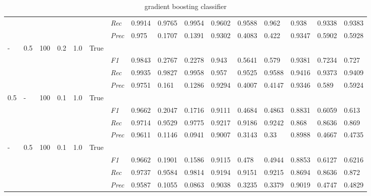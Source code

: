 \begin{table}[]
\begin{tabularx}{\textwidth}{XXXXXX|X|XXX|XXX|XXX}
    & & & & & & \textit{Rec} & 0.9914 & 0.9765 & 0.9954    & 0.9602 & 0.9588    & 0.962    & 0.938    & 0.9338    & 0.9383    \\
    & & & & & & \textit{Prec} & 0.975 & 0.1707 & 0.1391 & 0.9302 & 0.4083 & 0.422 & 0.9347 & 0.5902 & 0.5928 \\ \midrule
    - & 0.5 & 100 & 0.2 & 1.0 &True & & & & & & & & & \\
    & & & & & & \textit{F1} & 0.9843 & 0.2767 & 0.2278 & 0.943 & 0.5641        & 0.579        & 0.9381        & 0.7234        & 0.727        \\
    & & & & & & \textit{Rec} & 0.9935 & 0.9827 & 0.9958    & 0.957 & 0.9525    & 0.9588    & 0.9416    & 0.9373    & 0.9409    \\
    & & & & & & \textit{Prec} & 0.9751 & 0.161 & 0.1286 & 0.9294 & 0.4007 & 0.4147 & 0.9346 & 0.589 & 0.5924 \\ \midrule
    0.5 & - & 100 & 0.1 & 1.0 &True & & & & & & & & & \\
    & & & & & & \textit{F1} & 0.9662 & 0.2047 & 0.1716 & 0.9111 & 0.4684        & 0.4863        & 0.8831        & 0.6059        & 0.613        \\
    & & & & & & \textit{Rec} & 0.9714 & 0.9529 & 0.9775    & 0.9217 & 0.9186    & 0.9242    & 0.868    & 0.8636    & 0.869    \\
    & & & & & & \textit{Prec} & 0.9611 & 0.1146 & 0.0941 & 0.9007 & 0.3143 & 0.33 & 0.8988 & 0.4667 & 0.4735 \\ \midrule
    - & 0.5 & 100 & 0.1 & 1.0 &True & & & & & & & & & \\
    & & & & & & \textit{F1} & 0.9662 & 0.1901 & 0.1586 & 0.9115 & 0.478        & 0.4944        & 0.8853        & 0.6127        & 0.6216        \\
    & & & & & & \textit{Rec} & 0.9737 & 0.9584 & 0.9814    & 0.9194 & 0.9151    & 0.9215    & 0.8694    & 0.8636    & 0.872    \\
    & & & & & & \textit{Prec} & 0.9587 & 0.1055 & 0.0863 & 0.9038 & 0.3235 & 0.3379 & 0.9019 & 0.4747 & 0.4829 \\ \midrule
    \end{tabularx}
    \caption{gradient boosting classifier}
    \label{tab:all_results_gradient_boosting_classifier}
    \end{table}
    
